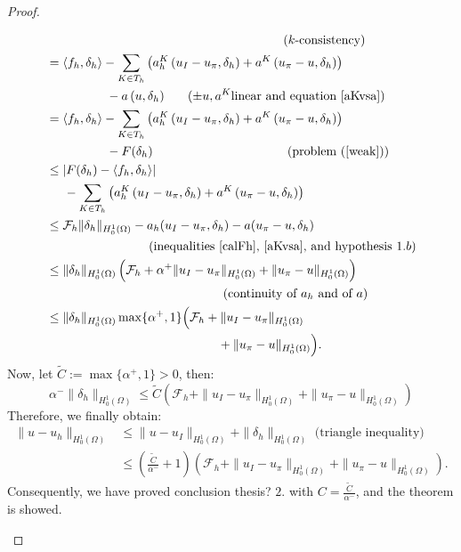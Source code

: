 \begin{proof}
\begin{enumerate}
\begin{align*}
&\hspace{6.7cm} (k\text{-consistency)}\\
&= \langle f_h, \delta_h\rangle - \sum_{K\in T_h}\left( a_h^K\left( u_I-u_\pi,\delta_h \right) + a^K\left( u_\pi-u, \delta_h \right) \right) \\
&\hspace{1.7cm}- a\left( u, \delta_h \right) \hspace{0.6cm} (\pm u, a^K \text{linear and equation \ref{aKvsa})}\\
&= \langle f_h, \delta_h\rangle - \sum_{K\in T_h}\left( a_h^K\left( u_I-u_\pi,\delta_h \right) + a^K\left( u_\pi-u, \delta_h \right) \right) \\
&\hspace{1.7cm}- F(\delta_h) \hspace{3.8cm}\text{(problem (\ref{weak}))}\\
&\leq |F(\delta_h) - \langle f_h, \delta_h \rangle| \\
&\hspace{0.5cm} - \sum_{K\in T_h}\left( a_h^K\left( u_I-u_\pi,\delta_h \right) + a^K\left( u_\pi-u, \delta_h \right) \right)\\
&\leq \mathcal{F}_h\|\delta_h\|_{H_0^1(\Omega)}-a_h(u_I-u_\pi,\delta_h)-a(u_\pi-u,\delta_h)\\
&\hspace{2.9cm} \text{(inequalities \ref{calFh}, \ref{aKvsa}, and hypothesis }1.b)\\
&\leq \|\delta_h\|_{H_0^1(\Omega)} \left (\mathcal{F}_h + \alpha^+\|u_I-u_\pi\|_{H_0^1(\Omega)} + \|u_\pi-u\|_{H_0^1(\Omega)} \right)\\
&\hspace{5cm} (\text{continuity of } a_h \text{ and of } a)\\
&\leq \|\delta_h\|_{H_0^1(\Omega)} \max\{\alpha^+,1\} \Big(\mathcal{F}_h + \|u_I-u_\pi\|_{H_0^1(\Omega)} \\
& \hspace{4.85cm} + \|u_\pi-u\|_{H_0^1(\Omega)} \Big).
\end{align*}
Now, let $\tilde{C} := \max\{\alpha^+,1\}>0$, then:
\begin{equation*}
\alpha^- \|\delta_h\|_{H_0^1(\Omega)}\leq \tilde{C}\left(\mathcal{F}_h + \|u_I-u_\pi\|_{H_0^1(\Omega)} + \|u_\pi-u\|_{H_0^1(\Omega)} \right)
\end{equation*}
Therefore, we finally obtain:
\begin{align*}
\|u-u_h\|_{H_0^1(\Omega)} &\leq \|u-u_I\|_{H_0^1(\Omega)} + \|\delta_h\|_{H_0^1(\Omega)} \text{ (triangle inequality)}\\ 
&\leq \left(\frac{\tilde{C}}{\alpha^-}+1\right)\left(\mathcal{F}_h + \|u_I-u_\pi\|_{H_0^1(\Omega)} + \|u_\pi-u\|_{H_0^1(\Omega)} \right).
\end{align*}
Consequently, we have proved conclusion {\color{red} thesis?} $2.$ with $C=\frac{\tilde{C}}{\alpha^-}$, and the theorem is showed. 
\end{enumerate}
\end{proof}

